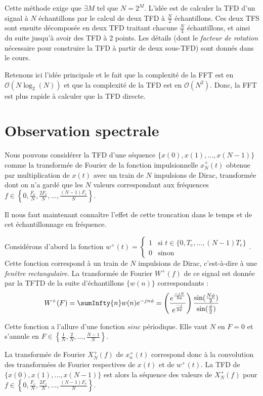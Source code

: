         Cette méthode exige que $\exists M$ tel que $N = 2^M$. L'idée est de calculer la TFD d'un signal à $N$ échantillons par le calcul de deux TFD à $\frac{N}{2}$ échantillons. Ces deux TFS sont ensuite décomposée en deux TFD traitant chacune $\frac{N}{4}$ échantillons, et ainsi du suite jusqu'à avoir des TFD à 2 points. Les détails (dont le \textit{facteur de rotation} nécessaire pour construire la TFD à partir de deux sous-TFD) sont donnés dans le cours.

        Retenons ici l'idée principale et le fait que la complexité de la FFT est en $\mathcal{O}(N \log_2(N))$ et que la complexité de la TFD est en $\mathcal{O}(N^2)$. Donc, la FFT est plus rapide à calculer que la TFD directe.

    \section{Observation spectrale}
        Nous pouvons considérer la TFD d’une séquence $\{x(0),x(1),...,x(N-1)\}$ comme la transformée de Fourier de la fonction impulsionnelle $x_N^+(t)$ obtenue par multiplication de $x(t)$ avec un train de $N$ impulsions de Dirac, transformée dont on n’a gardé que les $N$ valeurs correspondant aux fréquences $f\in \left\{0, \frac{F_e}{N}, \frac{2F_e}{N}, \dots, \frac{(N-1)F_e}{N}\right\}$.

        Il nous faut maintenant connaître l'effet de cette troncation dans le temps et de cet échantillonnage en fréquence.

        Considérons d'abord la fonction $w^+(t) = \begin{cases}
            1 &\text{si } t \in \{0, T_e, \dots, (N-1)T_e\}\\
            0 &\text{sinon}
        \end{cases}$. Cette fonction correspond à un train de $N$ impulsions de Dirac, c'est-à-dire à une \textit{fenêtre rectangulaire}. La transformée de Fourier $W^+(f)$ de ce signal est donnée par la TFTD de la suite d'échantillons $\{w(n)\}$ correspondants :
        $$
            W^+(F) = \sumInfty{n} w(n)e^{-jn\phi} = \left(\frac{e^{\frac{-jN}{2\phi}}}{e^{\frac{-j}{2\phi}}}\right) \frac{\sin(\frac{N\phi}{2})}{\sin(\frac{\phi}{2})}
        $$
        
        Cette fonction a l'allure d'une fonction $sinc$ périodique. Elle vaut $N$ en $F=0$ et s'annule en $F\in\left\{\frac{1}{N}, \frac{2}{N}, \dots, \frac{N-1}{N}\right\}$.

        La transformée de Fourier $X_N^+(f)$ de $x_n^+(t)$ correspond donc à la convolution des transformées de Fourier respectives de $x(t)$ et de $w^+(t)$. La TFD de $\{x(0), x(1), \dots, x(N-1)\}$ est alors la séquence des valeurs de $X_N^+(f)$ pour $f\in\left\{0, \frac{F_e}{N}, \frac{2F_e}{N}, \dots, \frac{(N-1)F_e}{N}\right\}$.

